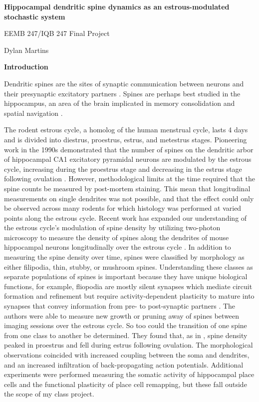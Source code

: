 \documentclass[11pt]{article}
\begin{document}
\noindent \textbf{Hippocampal dendritic spine dynamics as an estrous-modulated stochastic system}

\noindent EEMB 247/IQB 247 Final Project

\noindent Dylan Martins

\vspace{10pt}

\noindent \textbf{Introduction}



Dendritic spines are the sites of synaptic communication between neurons and their presynaptic excitatory partners \cite{spines}. Spines are perhaps best studied in the hippocampus, an area of the brain implicated in memory consolidation and spatial navigation \cite{hippocampus}.

The rodent estrous cycle, a homolog of the human menstrual cycle, lasts 4 days and is divided into diestrus, proestrus, estrus, and metestrus stages. Pioneering work in the 1990s demonstrated that the number of spines on the dendritic arbor of hippocampal CA1 excitatory pyramidal neurons are modulated by the estrous cycle, increasing during the proestrus stage and decreasing in the estrus stage following ovulation \cite{woolley}. However, methodological limits at the time required that the spine counts be measured by post-mortem staining. This mean that longitudinal measurements on single dendrites was not possible, and that the effect could only be observed across many rodents for which histology was performed at varied points along the estrous cycle. Recent work has expanded our understanding of the estrous cycle's modulation of spine density by utilizing two-photon microscopy to measure the density of spines along the dendrites of mouse hippocampal neurons longitudinally over the estrous cycle \cite{nora}. In addition to measuring the spine density over time, spines were classified by morphology as either filipodia, thin, stubby, or mushroom spines. Understanding these classes as separate populations of spines is important because they have unique biological functions, for example, fliopodia are mostly silent synapses which mediate circuit formation and refinement but require activity-dependent plasticity to mature into synapses that convey information from pre- to post-synaptic partners \cite{silent}. The authors \cite{nora} were able to measure new growth or pruning away of spines between imaging sessions over the estrous cycle. So too could the transition of one spine from one class to another be determined. They found that, as in \cite{woolley}, spine density peaked in proestrus and fell during estrus following ovulation\cite{nora}. The morphological observations coincided with increased coupling between the soma and dendrites, and an increased infiltration of back-propagating action potentials\cite{nora}. Additional experiments were performed measuring the somatic activity of hippocampal place cells and the functional plasticity of place cell remapping, but these fall outside the scope of my class project.
\end{document}
